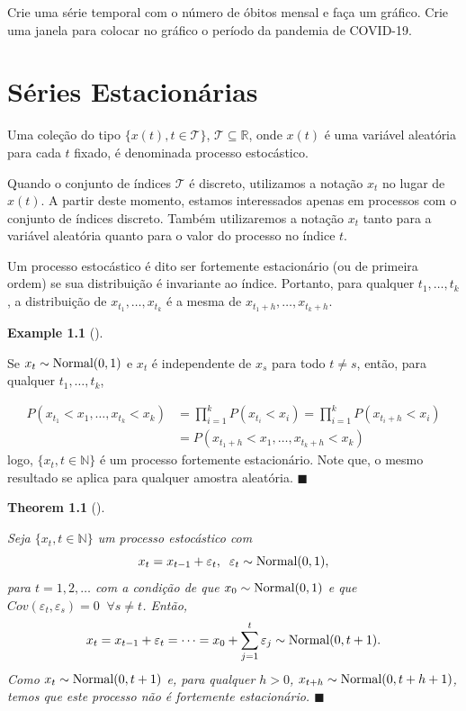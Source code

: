 \documentclass[
  letterpaper,
  DIV=11,
  numbers=noendperiod]{scrartcl}
\theoremstyle{definition}
\newtheorem{example}{Example}[chapter]
\theoremstyle{definition}
\theoremstyle{plain}
\theoremstyle{plain}
\newtheorem{theorem}{Theorem}[chapter]
\theoremstyle{remark}
\begin{document}
Crie uma série temporal com o número de óbitos mensal e faça um gráfico.
Crie uma janela para colocar no gráfico o período da pandemia de
COVID-19.


\chapter{Séries Estacionárias}\label{suxe9ries-estacionuxe1rias}

Uma coleção do tipo \(\{x(t),t\in\mathcal{T}\}\),
\(\mathcal{T}\subseteq \mathbb{R}\), onde \(x(t)\) é uma variável
aleatória para cada \(t\) fixado, é denominada processo estocástico.

Quando o conjunto de índices \(\mathcal{T}\) é discreto, utilizamos a
notação \(x_t\) no lugar de \(x(t)\). A partir deste momento, estamos
interessados apenas em processos com o conjunto de índices discreto.
Também utilizaremos a notação \(x_t\) tanto para a variável aleatória
quanto para o valor do processo no índice \(t\).

Um processo estocástico é dito ser fortemente estacionário (ou de
primeira ordem) se sua distribuição é invariante ao índice. Portanto,
para qualquer \(t_1,\ldots,t_k\), a distribuição de
\(x_{t_1},\ldots,x_{t_k}\) é a mesma de \(x_{t_1+h},\ldots,x_{t_k+h}\).

\begin{example}[]\protect\hypertarget{exm-serie_estacionaria_1}{}\label{exm-serie_estacionaria_1}

Se \(x_t\sim \hbox{Normal}(0,1)\) e \(x_t\) é independente de \(x_s\)
para todo \(t\neq s\), então, para qualquer \(t_1,\ldots,t_k\),

\begin{align}P(x_{t_1}<x_1,\ldots,x_{t_k}<x_k)&=\prod_{i=1}^k P(x_{t_i}<x_i)=\prod_{i=1}^k P(x_{t_i+h}<x_i)\\&=P(x_{t_1+h}<x_1,\ldots,x_{t_k+h}<x_k)\end{align}
logo, \(\{x_t,t\in \mathbb{N}\}\) é um processo fortemente estacionário.
Note que, o mesmo resultado se aplica para qualquer amostra aleatória.
\(\blacksquare\)

\end{example}

\begin{theorem}[]\protect\hypertarget{thm-exm_estacionaria2}{}\label{thm-exm_estacionaria2}

Seja \(\{x_t,t\in\mathbb{N}\}\) um processo estocástico com
\[x_t= x_{t-1}+\varepsilon_t,\;\;\varepsilon_t\sim\hbox{Normal}(0,1),\]
para \(t=1,2,\ldots\) com a condição de que
\(x_0\sim\hbox{Normal}(0,1)\) e que
\(Cov(\varepsilon_t,\varepsilon_s)=0\;\;\forall s\neq t\). Então,
\[x_t=x_{t-1}+\varepsilon_{t}=\cdots=x_0+\sum_{j=1}^t\varepsilon_j\sim\hbox{Normal}(0,t+1).\]
Como \(x_t\sim\hbox{Normal}(0,t+1)\) e, para qualquer \(h>0\),
\(x_{t+h}\sim\hbox{Normal}(0,t+h+1)\), temos que este processo não é
fortemente estacionário. \(\blacksquare\)

\end{theorem}
\end{document}
